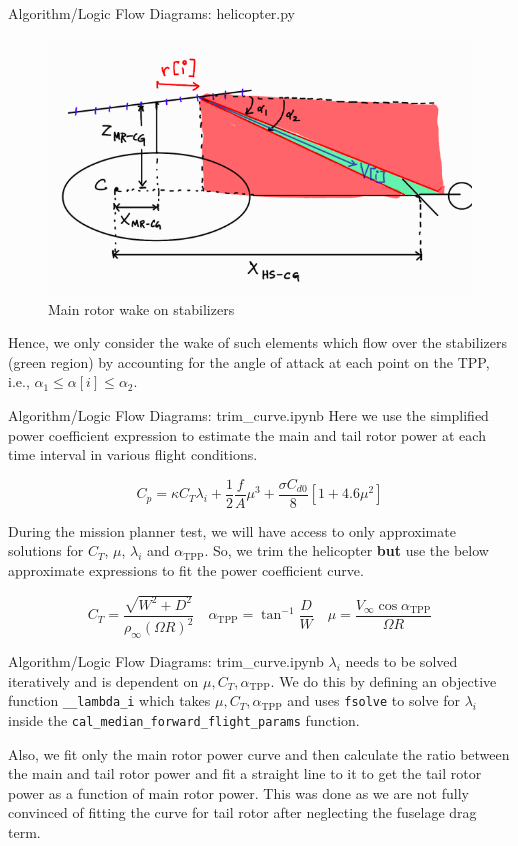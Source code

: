 \documentclass{beamer}
\begin{document}
\begin{frame}{Algorithm/Logic Flow Diagrams: helicopter.py}
  
  \begin{figure}
    \centering
    \includegraphics[width=0.7\linewidth]{../images/stab-wake.png}
    \caption{Main rotor wake on stabilizers}
  \end{figure}

  Hence, we only consider the wake of such elements which flow over the stabilizers (green region) by accounting for the angle of attack at each point on the TPP, i.e., $\alpha_1 \leq \alpha[i] \leq \alpha_2$.
\end{frame}

\begin{frame}{Algorithm/Logic Flow Diagrams: trim\_curve.ipynb}
      Here we use the simplified power coefficient expression to estimate the main and tail rotor power at each time interval in various flight conditions. 

      \[
        C_p = \kappa C_T \lambda_i + \dfrac{1}{2}\dfrac{f}{A}\mu^3 + \dfrac{\sigma C_{d0}}{8}[1+4.6\mu^2]
      \]

      During the mission planner test, we will have access to only approximate solutions for $C_T$, $\mu$, $\lambda_i$ and $\alpha_\text{TPP}$. So, we trim the helicopter \textbf{but} use the below approximate expressions to fit the power coefficient curve.
      
      \[
        C_T = \dfrac{\sqrt{W^2+D^2}}{\rho_\infty (\Omega R)^2} \quad \alpha_\text{TPP} = \tan^{-1}{\dfrac{D}{W}} \quad \mu  = \dfrac{V_\infty\cos{\alpha_\text{TPP}}}{\Omega R}
      \]
\end{frame}

\begin{frame}{Algorithm/Logic Flow Diagrams: trim\_curve.ipynb}
  $\lambda_i$ needs to be solved iteratively and is dependent on $\mu, C_T, \alpha_\text{TPP}$. 
  We do this by defining an objective function \texttt{\_\_lambda\_i} which takes $\mu, C_T, \alpha_\text{TPP}$ and uses \texttt{fsolve} to solve for $\lambda_i$ inside the \texttt{cal\_median\_forward\_flight\_params} function.

  Also, we fit only the main rotor power curve and then calculate the ratio between the main and tail rotor power  and fit a straight line to it to get the tail rotor power as a function of main rotor power. This was done as we are not fully convinced of fitting the curve for tail rotor after neglecting the fuselage drag term.
\end{frame}
\end{document}
